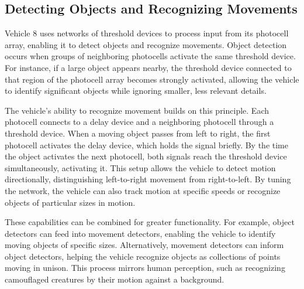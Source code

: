 \documentclass{article}
\begin{document}
	\subsection*{Detecting Objects and Recognizing Movements}
	Vehicle 8 uses networks of threshold devices to process input from its photocell array, enabling it to detect objects and recognize movements. Object detection occurs when groups of neighboring photocells activate the same threshold device. For instance, if a large object appears nearby, the threshold device connected to that region of the photocell array becomes strongly activated, allowing the vehicle to identify significant objects while ignoring smaller, less relevant details.

	The vehicle's ability to recognize movement builds on this principle. Each photocell connects to a delay device and a neighboring photocell through a threshold device. When a moving object passes from left to right, the first photocell activates the delay device, which holds the signal briefly. By the time the object activates the next photocell, both signals reach the threshold device simultaneously, activating it. This setup allows the vehicle to detect motion directionally, distinguishing left-to-right movement from right-to-left. By tuning the network, the vehicle can also track motion at specific speeds or recognize objects of particular sizes in motion.

	These capabilities can be combined for greater functionality. For example, object detectors can feed into movement detectors, enabling the vehicle to identify moving objects of specific sizes. Alternatively, movement detectors can inform object detectors, helping the vehicle recognize objects as collections of points moving in unison. This process mirrors human perception, such as recognizing camouflaged creatures by their motion against a background.
\end{document}
